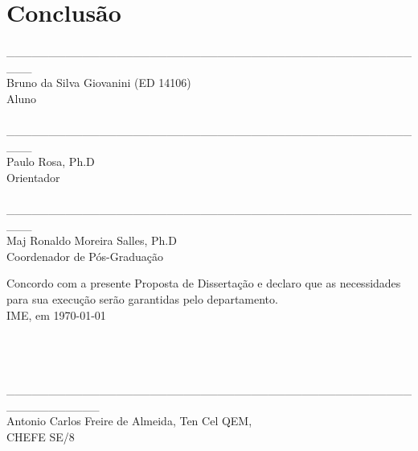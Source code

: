 \documentclass[a4paper, 12pt]{article}
\begin{document}
\section{Conclusão}
\label{sec:conclusao}

\newpage


 

\newpage

\begin{center}
\_\_\_\_\_\_\_\_\_\_\_\_\_\_\_\_\_\_\_\_\_\_\_\_\_\_\_\_\_\_\_\_\_\_\_\_\_\_\_\_\_\_\_\_\_\_\_\_\_\_\_ \\

Bruno da Silva Giovanini (ED 14106) \\Aluno \\ 
 
\hspace{4cm}
\\


\_\_\_\_\_\_\_\_\_\_\_\_\_\_\_\_\_\_\_\_\_\_\_\_\_\_\_\_\_\_\_\_\_\_\_\_\_\_\_\_\_\_\_\_\_\_\_\_\_\_\_ \\
Paulo Rosa, Ph.D \\Orientador \\ 

\hspace{4cm}
\\


\_\_\_\_\_\_\_\_\_\_\_\_\_\_\_\_\_\_\_\_\_\_\_\_\_\_\_\_\_\_\_\_\_\_\_\_\_\_\_\_\_\_\_\_\_\_\_\_\_\_\_ \\
Maj Ronaldo Moreira Salles, Ph.D \\Coordenador de Pós-Graduação \\

\hspace{4cm}

\end{center}
Concordo com a presente Proposta de Dissertação e declaro que as necessidades para sua execução serão garantidas pelo departamento. \\
IME, em \today
 \hspace{4cm}
 \\
 \\
 \\
 \\
 
\begin{center}
\_\_\_\_\_\_\_\_\_\_\_\_\_\_\_\_\_\_\_\_\_\_\_\_\_\_\_\_\_\_\_\_\_\_\_\_\_\_\_\_\_\_\_\_\_\_\_\_\_\_\_\_\_\_\_\_\_\_\_ \\
Antonio Carlos Freire de Almeida, Ten Cel QEM, \\
CHEFE SE/8
\end{center}
\end{document}
